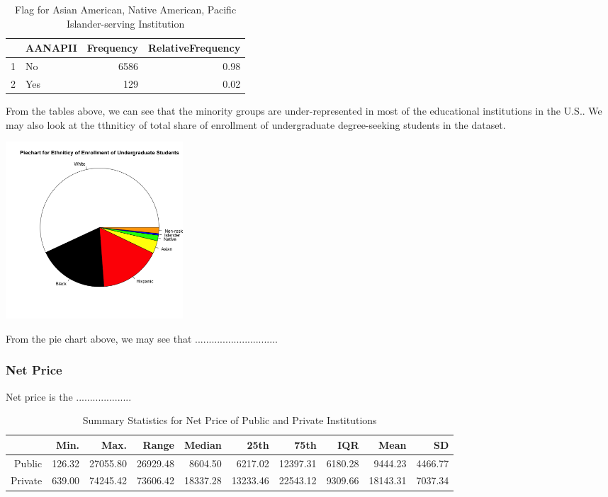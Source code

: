 \documentclass{article}\usepackage[]{graphicx}\usepackage[]{color}
\newenvironment{knitrout}{}{} %
\begin{document}
\begin{table}[ht]
\centering
\begin{tabular}{rlrr}
  \hline
 & AANAPII & Frequency & RelativeFrequency \\ 
  \hline
1 & No & 6586 & 0.98 \\ 
  2 & Yes & 129 & 0.02 \\ 
   \hline
\end{tabular}
\caption{Flag for Asian American, Native American, Pacific Islander-serving Institution} 
\end{table}


From the tables above, we can see that the minority groups are under-represented in most of the educational institutions in the U.S.. We may also look at the tthniticy of total share of enrollment of undergraduate degree-seeking students in the dataset.

\begin{knitrout}
\color{fgcolor}

{\centering \includegraphics[width=250px]{../images/piechart-enrollmentEthnicity} 

}



\end{knitrout}

From the pie chart above, we may see that ..............................

\subsubsection{Net Price}
Net price is the ....................

\begin{table}[ht]
\centering
\begin{tabular}{rrrrrrrrrr}
  \hline
 & Min. & Max. & Range & Median & 25th & 75th & IQR & Mean & SD \\ 
  \hline
Public & 126.32 & 27055.80 & 26929.48 & 8604.50 & 6217.02 & 12397.31 & 6180.28 & 9444.23 & 4466.77 \\ 
  Private & 639.00 & 74245.42 & 73606.42 & 18337.28 & 13233.46 & 22543.12 & 9309.66 & 18143.31 & 7037.34 \\ 
   \hline
\end{tabular}
\caption{Summary Statistics for Net Price of Public and Private Institutions} 
\end{table}
\end{document}

